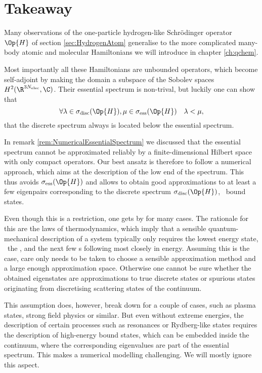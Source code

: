 \section{Takeaway}
\label{sec:SpectralTakeAway}
Many observations of the one-particle hydrogen-like Schrödinger operator $\Op{H}$
of section \vref{sec:HydrogenAtom}
generalise to the more complicated many-body atomic and molecular Hamiltonians
we will introduce in chapter \vref{ch:qchem}.

Most importantly all these Hamiltonians are unbounded operators,
which become self-adjoint by making the domain
a subspace of the Sobolev spaces $H^2(\R^{3\Nelec}, \C)$.
Their essential spectrum is non-trival,
but luckily one can show~\cite{Zhislin1959,Zhislin1960,Reed1978,Teschl2014} that
\[ \forall \lambda \in \sigma_{\text{disc}}(\Op{H}),
	\mu \in \sigma_{\text{ess}}(\Op{H}) \quad \lambda < \mu, \]
\ie that the discrete spectrum always is located below the essential spectrum.

In remark \vref{rem:NumericalEssentialSpectrum} we discussed
that the essential spectrum cannot be approximated reliably
by a finite-dimensional Hilbert space with only compact operators.
Our best ansatz is therefore to follow a numerical approach,
which aims at the description of the low end of the spectrum.
This thus avoids $\sigma_{\text{ess}}(\Op{H})$
and allows to obtain good approximations to at least a few
eigenpairs corresponding to the discrete spectrum $\sigma_{\text{disc}}(\Op{H})$,
\ie~bound states.

Even though this is a restriction, one gets by for many cases.
The rationale for this are the laws of thermodynamics,
which imply that a sensible quantum-mechanical description of a system
typically only requires the lowest energy state,
\ie~the , and the next few s
following most closely in energy.
Assuming this is the case,
care only needs to be taken to choose a sensible approximation
method and a large enough approximation space.
Otherwise one cannot be sure whether the obtained eigenstates
are approximations to true discrete states
or spurious states originating from discretising scattering states
of the continuum.

This assumption does, however, break down for a couple of cases,
such as plasma states,
strong field physics or similar.
But even without extreme energies, the description of certain
processes such as resonances or Rydberg-like states
requires the description of high-energy bound states,
which can be embedded inside the continuum,
\ie where the corresponding eigenvalues are part of the essential spectrum.
This makes a numerical modelling challenging.
We will mostly ignore this aspect.
